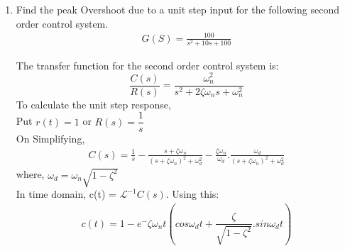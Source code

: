 \begin{enumerate}[label=\thesubsection.\arabic*.,ref=\thesubsection.\theenumi]
\item Find the peak Overshoot due to a unit step input for the following second order control system.
\begin{align}
    G(S) = \frac{100}{s^2 + 10s +100}    
\end{align}

The transfer function for the second order control system is:
\begin{equation}
    \dfrac{C(s)}{R(s)}= \dfrac{\omega_n^2}{s^2 + 2\zeta\omega_ns + \omega_n^2}
\end{equation}
To calculate the unit step response,
\\
Put $r(t) = 1$ or $R(s) = \dfrac{1}{s}$
\\
On Simplifying, 
\begin{align}
    C(s) = \frac{1}{s}-\frac{s+\zeta\omega_n}{(s + \zeta\omega_n)^2 + \omega_d^2} - \frac{\zeta\omega_n}{\omega_d}.\frac{\omega_d}{(s + \zeta\omega_n)^2 + \omega_d^2}  
\end{align}
where, $\omega_d=\omega_n\sqrt{1-\zeta^2}$
\\In time domain, c(t) = $\mathcal{L}^{-1}{C(s)}$. Using this:
\begin{align}
    c(t) = 1 - e^-\zeta\omega_nt(cos\omega_dt+\dfrac{\zeta}{\sqrt{1-\zeta^2}}.sin\omega_dt)
    \label{eq:eebtech11045_ct}
\end{align}


\end{enumerate}
